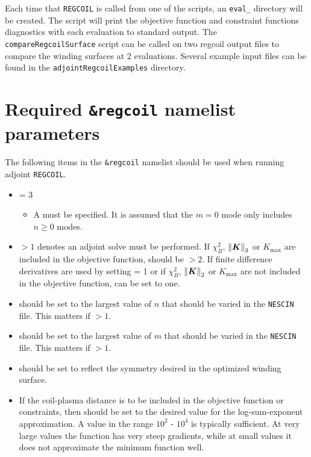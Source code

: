 Each time that \texttt{REGCOIL} is called from one of the scripts, an \texttt{eval\_} directory will be created. The script will print the objective function and constraint functions diagnostics with each evaluation to standard output. The \texttt{compareRegcoilSurface} script can be called on two regcoil output files to compare the winding surfaces at 2 evaluations. Several example input files can be found in the \texttt{adjointRegcoilExamples} directory.

\section{Required \texttt{\&regcoil} namelist parameters}
The following items in the \texttt{\&regcoil} namelist should be used when running adjoint \texttt{REGCOIL}. 
\begin{itemize}
\item {} = 3 
    \begin{itemize}
    \item A  must be specified. It is assumed that the $m=0$ mode only includes $n\geq0$ modes. 
    \end{itemize}
\item {} $>1$ denotes an adjoint solve must be performed. If $\chi^2_B$, $\norm{\bm{K}}_2$ or $K_{\text{max}}$ are included in the objective function,  should be $>2$. If finite difference derivatives are used by setting  = 1 or if $\chi^2_B$, $\norm{\bm{K}}_2$ or $K_{\text{max}}$ are not included in the objective function,  can be set to one. 
\item {} should be set to the largest value of $n$ that should be varied in the \texttt{NESCIN} file. This matters if  $>1$.
\item {} should be set to the largest value of $m$ that should be varied in the \texttt{NESCIN} file. This matters if  $>1$.
\item {} should be set to reflect the symmetry desired in the optimized winding surface. 
\item If the coil-plasma distance is to be included in the objective function or constraints, then  should be set to the desired value for the log-sum-exponent approximation. A value in the range $10^{2}$ - $10^4$ is typically sufficient. At very large values the function has very steep gradients, while at small values it does not approximate the minimum function well. 

\end{itemize}
